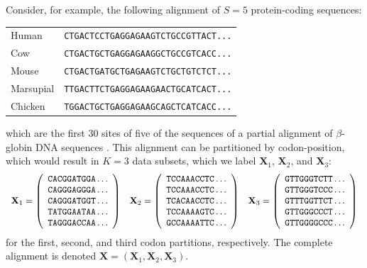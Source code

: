 \documentclass[11pt]{article}
\begin{document}
Consider, for example, the following alignment of $S=5$ protein-coding sequences:
\begin{center}
\begin{tabular}{ll}
Human      & {\tt CTGACTCCTGAGGAGAAGTCTGCCGTTACT...} \\
Cow        & {\tt CTGACTGCTGAGGAGAAGGCTGCCGTCACC...} \\
Mouse      & {\tt CTGACTGATGCTGAGAAGTCTGCTGTCTCT...} \\
Marsupial  & {\tt TTGACTTCTGAGGAGAAGAACTGCATCACT...} \\
Chicken    & {\tt TGGACTGCTGAGGAGAAGCAGCTCATCACC...}
\end{tabular}
\end{center}
which are the first $30$ sites of five of the sequences of a partial alignment of $\beta$-globin DNA sequences \citep{yang00}.
This alignment can be partitioned by codon-position, which would result in $K=3$ data subsets, which
we label ${\mathbf X}_1$, ${\mathbf X}_2$, and ${\mathbf X}_3$:
$$
\begin{array}{ccc}
{\mathbf X}_1 = \left( \begin{array}{c}
{\tt CACGGATGGA} \ldots \\
{\tt CAGGGAGGGA} \ldots \\
{\tt CAGGGATGGT} \ldots \\
{\tt TATGGAATAA} \ldots \\
{\tt TAGGGACCAA} \ldots \\
\end{array} \right) 
&
{\mathbf X}_2 = \left( \begin{array}{c}
{\tt TCCAAACCTC} \ldots \\
{\tt TCCAAACCTC} \ldots \\
{\tt TCACAACCTC} \ldots \\
{\tt TCCAAAAGTC} \ldots \\
{\tt GCCAAAATTC} \ldots \\
\end{array} \right) 
&
{\mathbf X}_3 = \left( \begin{array}{c}
{\tt GTTGGGTCTT} \ldots \\
{\tt GTTGGGTCCC} \ldots \\
{\tt GTTTGGTTCT} \ldots \\
{\tt GTTGGGCCCT} \ldots \\
{\tt GTTGGGGCCC} \ldots \\
\end{array} \right) 
\end{array}
$$
for the first, second, and third codon partitions, respectively.
The complete alignment is denoted ${\mathbf X} = ({\mathbf X}_1,{\mathbf X}_2,{\mathbf X}_3)$.
\end{document}
